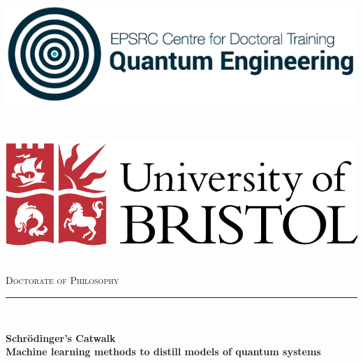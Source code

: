 \begin{titlepage}

    \newcommand{\HRule}{\rule{\linewidth}{0.5mm}} %
    
    \center %
     
    \vspace{1cm}
    \begin{minipage}{0.4\textwidth}
    \begin{flushleft} 
        \includegraphics[scale=2]{logos/qecdt.png}
    \end{flushleft}
    \end{minipage}
    ~
    \begin{minipage}{0.4\textwidth}
    \begin{flushright} \large
        \includegraphics[scale=0.2]{logos/bristol_uni.png}
    \end{flushright}
    \end{minipage}\\[1cm]
    

    \vspace{2cm}
    \textsc{
        \LARGE Doctorate of Philosophy \\
    }
    \vspace{1.5cm}
    \HRule \\[0.4cm]
    { \Huge \bfseries Schr\"odinger's Catwalk \\
     \large  Machine learning methods to distill models of quantum systems
    
}
\end{titlepage}
